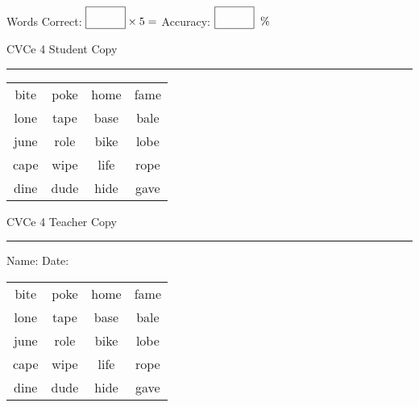\documentclass{memoir}
\begin{document}
\small

Words Correct: $\fbox{\phantom{\huge 100}} \times 5 = $ Accuracy: $\fbox{\phantom{\huge 100}}\;\; \%$ 

\vfill

\newpage


\footnotesize \noindent
CVCe 4 \hfill Student Copy
\smallskip
\hrule

\Large

\setlength{\tabcolsep}{14pt}
\def\arraystretch{2}

{\selectfont


\begin{vplace}[0.5]
\begin{center}
\begin{tabular}{cccc}
bite & poke & home & fame \\
lone & tape & base & bale \\
june & role & bike & lobe \\
cape & wipe & life & rope \\
dine & dude & hide & gave \\
\end{tabular}
\end{center}
\end{vplace}

}

\newpage

\footnotesize \noindent
CVCe 4 \hfill Teacher Copy
\smallskip
\hrule

\small

\vfill

\noindent
Name: \underline{\hspace{1.75in}} \hfill Date: \underline{\hspace{1in}}

\Large

{\selectfont


\begin{vplace}[0.5]
\begin{center}
\begin{tabular}{cccc}
bite & poke & home & fame \\
lone & tape & base & bale \\
june & role & bike & lobe \\
cape & wipe & life & rope \\
dine & dude & hide & gave \\
\end{tabular}
\end{center}
\end{vplace}



}
\end{document}
